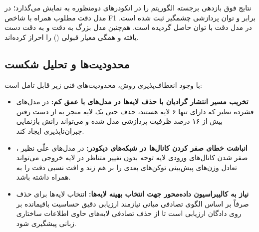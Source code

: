نتایج فوق بازدهی برجسته الگوریتم را در انکودرهای دومنظوره به نمایش می‌گذارد؛ در مدل  دقت مطلوب  همراه با شاخص F1 برابر  و توان پردازشی چشمگیر  ثبت شده است. در مدل  دقت  با توان  حاصل گردیده است. هم‌چنین مدل بزرگ  به دقت  و  به دقت  دست یافته و همگی معیار قبولی () را احراز کرده‌اند.

\subsection{محدودیت‌ها و تحلیل شکست}
با وجود انعطاف‌پذیری روش، محدودیت‌های فنی زیر قابل تامل است:
\begin{itemize}
    \item \textbf{تخریب مسیر انتشار گرادیان با حذف لایه‌ها در مدل‌های با عمق کم:} در مدل‌های فشرده نظیر  که دارای تنها ۶ لایه هستند، حذف حتی یک لایه منجر به از دست رفتن بیش از ۱۶ درصد ظرفیت پردازشی مدل شده و می‌تواند رانش بازنمایی جبران‌ناپذیری ایجاد کند.
    \item \textbf{انباشت خطای صفر کردن کانال‌ها در شبکه‌های دیکودر:} در مدل‌های علّی نظیر ، صفر شدن کانال‌های ورودی لایه توجه بدون تغییر متناظر در لایه خروجی می‌تواند تعادل وزن‌های پیش‌بینی توکن‌های بعدی را بر هم زند و افت نسبی دقت را به همراه داشته باشد.
    \item \textbf{نیاز به کالیبراسیون داده‌محور جهت انتخاب بهینه لایه‌ها:} انتخاب لایه‌ها برای حذف صرفاً بر اساس الگوی تصادفی میانی نیازمند ارزیابی دقیق حساسیت باقیمانده بر روی دادگان ارزیابی است تا از حذف تصادفی لایه‌های حاوی اطلاعات ساختاری زبانی پیشگیری شود.
\end{itemize}
